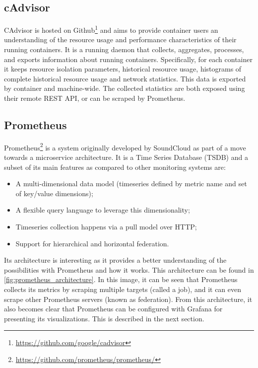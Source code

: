 \subsection{cAdvisor}
CAdvisor is hosted on Github\footnote{\url{https://github.com/google/cadvisor}} and aims to provide container users an understanding of the resource usage and performance characteristics of their running containers. It is a running daemon that collects, aggregates, processes, and exports information about running containers. Specifically, for each container it keeps resource isolation parameters, historical resource usage, histograms of complete historical resource usage and network statistics. This data is exported by container and machine-wide. The collected statistics are both exposed using their remote REST API, or can be scraped by Prometheus.

\subsection{Prometheus} \label{sec:prometheus}
Prometheus\footnote{\url{https://github.com/prometheus/prometheus/}} is a system originally developed by SoundCloud as part of a move towards a microservice architecture. It is a Time Series Database (TSDB) and a subset of its main features as compared to other monitoring systems are: 

\begin{itemize}
    \item A multi-dimensional data model (timeseries defined by metric name and set of key/value dimensions);
    \item A flexible query language to leverage this dimensionality;
    \item Timeseries collection happens via a pull model over HTTP;
    \item Support for hierarchical and horizontal federation.
\end{itemize}
    
Its architecture is interesting as it provides a better understanding of the possibilities with Prometheus and how it works. This architecture can be found in \autoref{fig:prometheus_architecture}. In this image, it can be seen that Prometheus collects its metrics by scraping multiple targets (called a job), and it can even scrape other Prometheus servers (known as federation). From this architecture, it also becomes clear that Prometheus can be configured with Grafana for presenting its visualizations. This is described in the next section.\\


